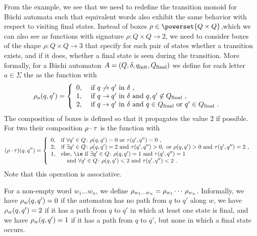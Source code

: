 \documentclass[../../diss.tex]{subfiles}
\begin{document}
From the example, we see that we need to redefine the transition monoid for Büchi automata such that equivalent words also exhibit the same behavior with respect to visiting final states.
%
Instead of boxes $\rho \in \powerset{Q \times Q}$,which we can also see as functions with signature $\rho \colon Q \times Q \to 2$, we need to consider boxes of the shape $\rho \colon Q \times Q \to 3$ that specify for each pair of states whether a transition exists, and if it does, whether a final state is seen during the transition.
More formally, for a Büchi automaton $A = (Q, \delta, q_{\text{init}}, Q_{\text{final}})$ we define for each letter $a \in \Sigma$ the  as the function with
\[
    \tbox{a}(q,q')
    =
    \left\{
    \begin{array}{ll}
        0, & \text{ if $q \not\to q'$ in $\delta$}\ ,\\
        1, & \text{ if $q \to q'$ in $\delta$ and $q,q' \not\in \QF$}\ ,\\
        2, & \text{ if $q \to q'$ in $\delta$ and $q \in \QF$ or $q' \in \QF$}\ .
    \end{array}
    \right.
\]
The composition of boxes is defined so that it propagates the value $2$ if possible.
For two  their composition $\rho \cdot \tau$ is the function with
\[
    (\rho \relcomp \tau)(q,q'')
    =
    \left\{
    \begin{array}{ll}
    0, & \text{if } \forall q' \in Q \colon \rho(q,q') = 0 \text{  or } \tau(q',q'') = 0\ ,\\

    2, & \text{if }  \exists q' \in Q \colon \rho(q,q') = 2 \text{ and } \tau(q',q'') > 0, \text{ or } \rho(q,q') > 0 \text{ and } \tau(q',q'')  = 2
    \ ,\\
    1, & \text{else, \ie if }\exists q' \in Q \colon \rho(q,q') = 1 \text{ and } \tau(q',q'') = 1
    \\
    & \quad \text{and }\forall q' \in Q \colon \rho(q,q') < 2 \text{ and } \tau(q',q'') < 2
    \ .
    \end{array}
    \right.
\]
Note that this operation is associative.

For a non-empty word $w_1 \ldots w_n$, we define $\tbox{w_1 \ldots w_n} = \tbox{w_1} \cdots \, \tbox{w_n}$.
Informally, we have $\tbox{w}(q,q') = 0$ if the automaton has no path from $q$ to $q'$ along $w$, we have $\tbox{w}(q,q') = 2$ if it has a path from $q$ to $q'$ in which at least one state is final, and we have $\tbox{w}(q,q') = 1$ if it has a path from $q$ to $q'$, but none in which a final state occurs.
\end{document}
